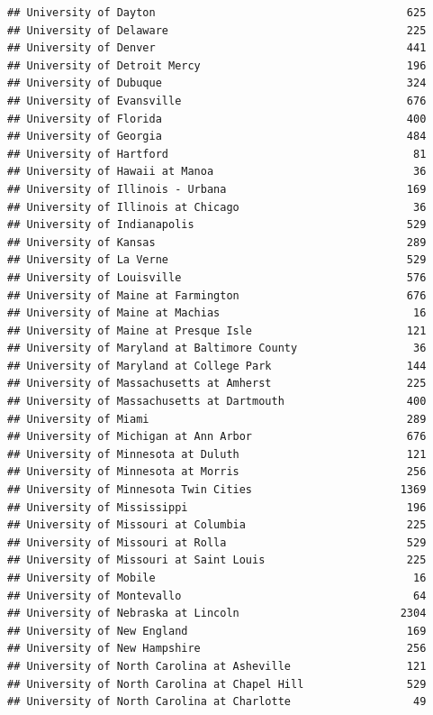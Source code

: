 \documentclass[
]{article}
\begin{document}
\begin{verbatim}
## University of Dayton                                       625
## University of Delaware                                     225
## University of Denver                                       441
## University of Detroit Mercy                                196
## University of Dubuque                                      324
## University of Evansville                                   676
## University of Florida                                      400
## University of Georgia                                      484
## University of Hartford                                      81
## University of Hawaii at Manoa                               36
## University of Illinois - Urbana                            169
## University of Illinois at Chicago                           36
## University of Indianapolis                                 529
## University of Kansas                                       289
## University of La Verne                                     529
## University of Louisville                                   576
## University of Maine at Farmington                          676
## University of Maine at Machias                              16
## University of Maine at Presque Isle                        121
## University of Maryland at Baltimore County                  36
## University of Maryland at College Park                     144
## University of Massachusetts at Amherst                     225
## University of Massachusetts at Dartmouth                   400
## University of Miami                                        289
## University of Michigan at Ann Arbor                        676
## University of Minnesota at Duluth                          121
## University of Minnesota at Morris                          256
## University of Minnesota Twin Cities                       1369
## University of Mississippi                                  196
## University of Missouri at Columbia                         225
## University of Missouri at Rolla                            529
## University of Missouri at Saint Louis                      225
## University of Mobile                                        16
## University of Montevallo                                    64
## University of Nebraska at Lincoln                         2304
## University of New England                                  169
## University of New Hampshire                                256
## University of North Carolina at Asheville                  121
## University of North Carolina at Chapel Hill                529
## University of North Carolina at Charlotte                   49

\end{verbatim}
\end{document}
